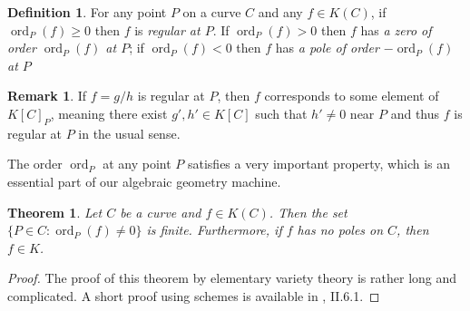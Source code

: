 \documentclass[12pt]{article}
\newtheorem{theorem}{Theorem}[subsection]
\theoremstyle{remark}
\theoremstyle{definition}
\newtheorem{remark}{Remark}[subsection]
\newtheorem{definition}{Definition}[subsection]
\newcommand{\ord}[0]{\operatorname{ord}}
\begin{document}
        \begin{definition}
            For any point $P$ on a curve $C$ and any $f\in K(C)$, if $\ord_P(f)\geqslant 0$ then $f$ is \textit{regular at $P$}. If $\ord_P(f)>0$ then $f$ has \textit{a zero of order $\ord_P(f)$ at $P$}; if $\ord_P(f)<0$ then $f$ has \textit{a pole of order $-\ord_P(f)$ at $P$}
        \end{definition}
        \begin{remark}
            If $f=g/h$ is regular at $P$, then $f$ corresponds to some element of $K[C]_P$, meaning there exist $g',h'\in K[C]$ such that $h'\neq 0$ near $P$ and thus $f$ is regular at $P$ in the usual sense.
        \end{remark}
        The order $\ord_P$ at any point $P$ satisfies a very important property, which is an essential part of our algebraic geometry machine.
        \begin{theorem}\label{theorem-fin-ord}
            Let $C$ be a curve and $f\in K(C)$. Then the set $\{P\in C:\ord_P(f)\neq 0\}$ is finite. Furthermore, if $f$ has no poles on $C$, then $f\in K$.
        \end{theorem}
        \begin{proof}
            The proof of this theorem by elementary variety theory is rather long and complicated. A short proof using schemes is available in \cite{hartshorne_2010_algebraic}, II.6.1.
        \end{proof}
        
        
        
\end{document}
